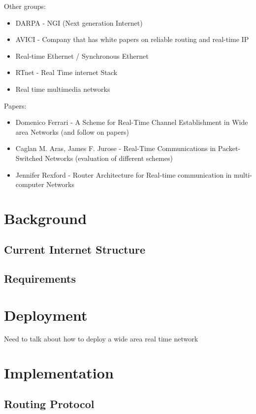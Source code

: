 \documentclass[times, 10pt,twocolumn]{article}
\begin{document}
Other groups:
\begin{itemize}
\item DARPA - NGI (Next generation Internet)
\item AVICI - Company that has white papers on reliable routing and real-time IP
\item Real-time Ethernet / Synchronous Ethernet
\item RTnet - Real Time internet Stack
\item Real time multimedia networks
\end{itemize}

Papers:
\begin{itemize}
\item Domenico Ferrari - A Scheme for Real-Time Channel Establishment in Wide area Networks (and follow on papers)
\item Caglan M. Aras, James F. Jurose - Real-Time Communications in Packet-Switched Networks (evaluation of different schemes)
\item Jennifer Rexford - Router Architecture for Real-time communication in multi-computer Networks
\end{itemize}



\section{Background}
\subsection{Current Internet Structure}

\subsection{Requirements}

\section{Deployment}
Need to talk about how to deploy a wide area real time network



\section{Implementation}
\subsection{Routing Protocol}
\end{document}
